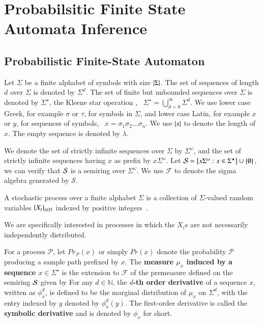 \DeclarePairedDelimiter{\ceil}{\lceil}{\rceil}
\renewcommand{\ceil}[1]{\left\lceil{#1}\right\rceil}

\section{Probabilsitic Finite State Automata Inference}
\label{sec:PFSA}

\subsection{Probabilistic Finite-State Automaton}
\label{subsec:DEFN_PFSA}
Let $\Sigma$ be a finite alphabet of symbols with size $\left\lvert \Sigma \right\rvert$. The set of sequences of length $d$ over $\Sigma$ is denoted by $\Sigma^d$. The set of finite but unbounded sequences over $\Sigma$ is denoted by $\Sigma^\star$, the Kleene star operation \cite{hopcroft2008introduction}, \ie~$\Sigma^{\star} = \bigcup_{d=0}^{\infty}\Sigma^{d}$. We use lower case Greek, for example $\sigma$ or $\tau$, for symbols in $\Sigma$, and lower case Latin, for example $x$ or $y$, for sequences of symbols, \ie~$x=\sigma_1\sigma_2\dots\sigma_n$. We use $\left\lvert x \right\rvert$ to denote the length of $x$.  The empty sequence is denoted by $\lambda$. 

We denote the set of strictly infinite sequences over $\Sigma$ by $\Sigma^\omega$, and the set of strictly infinite sequences having $x$ as prefix by $x\Sigma^\omega$. Let $\mathcal{S} = \left\{ x\Sigma^\omega: x \in \Sigma^\star \right\}\cup\left\{ \emptyset \right\}$, we can verify that $\mathcal{S}$ is a semiring \cite{klenke2013probability} over $\Sigma^{\omega}$. We use $\mathcal{F}$ to denote the sigma algebra generated by $\mathcal{S}$.

\begin{defn}
\label{defn:StochasticProcessOverSigma}
A stochastic process over a finite alphabet $\Sigma$ is a collection of $\Sigma$-valued random variables $\left\{ X_t \right\}_{t\in\mathbb{N}}$ indexed by positive integers~\cite{doob1990stochastic}.
\end{defn}
We are specifically interested in processes in which the $X_i$s are not necessarily independently distributed.

\begin{defn}
\label{defn:MeasureAndDeriv}
For a process $\mathscr{P}$, let $Pr_{\mathcal{P}}(x)$ or simply $Pr(x)$ denote the probability $\mathscr{P}$ producing a sample path prefixed by $x$. The \textbf{measure $\mu_x$ induced by a sequence $x\in \Sigma^{\star}$} is the extension \cite{klenke2013probability} to $\mathcal{F}$ of the premeasure defined on the semiring $\mathcal{S}$ given by
For any $d\in\mathbb{N}$, the \textbf{$d$-th order derivative} of a sequence $x$, written as $\phi^{d}_{x}$, is defined to be the marginal distribution of $\mu_{x}$ on $\Sigma^d$, with the entry indexed by $y$ denoted by $\phi^{d}_{x}(y)$. The first-order derivative is called the \textbf{symbolic derivative} and is denoted by $\phi_{x}$ for short.
\end{defn}

